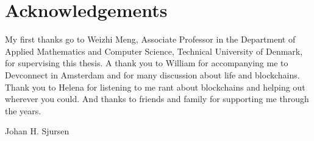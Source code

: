 
\section*{Acknowledgements}

My first thanks go to Weizhi Meng, Associate Professor in the Department of Applied Mathematics and Computer Science, Technical University of Denmark, for supervising this thesis. A thank you to William for accompanying me to Devconnect in Amsterdam and for many discussion about life and blockchains. Thank you to Helena for listening to me rant about blockchains and helping out wherever you could. And thanks to friends and family for supporting me through the years. 

\vspace*{\fill}

\hspace*{\fill} Johan H. Sjursen


\thispagestyle{empty} 